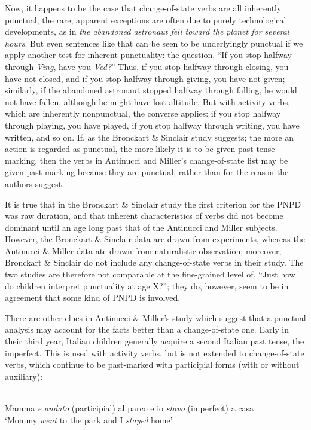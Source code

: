Now, it happens to be the case that change-of-state verbs are all inherently punctual; the rare, apparent exceptions are often due to purely technological developments, as in \textit{the abandoned astronaut fell toward the planet for several hours}. But even sentences like that can be seen to be underlyingly punctual if we apply another test for inherent punctuality: the question, ``If you stop halfway through \textit{Ving}, have you \textit{Ved?}'' Thus, if you stop halfway through closing, you have not closed, and if you stop halfway through giving, you have not given; similarly, if the abandoned astronaut stopped halfway through falling, he would not have fallen, although he might have lost altitude. But with activity verbs, which are inherently nonpunctual, the converse applies: if you stop halfway through playing, you have played, if you stop halfway through writing, you have written, and so on. If, as the Bronckart \& Sinclair study suggests; the more an action is regarded as punctual, the more likely it is to be given past-tense marking, then the verbs in Antinucci and Miller's change-of-state list may be given past marking because they are punctual, rather than for the reason the authors suggest.

It is true that in the Bronckart \& Sinclair study the first criterion for the PNPD was raw duration, and that inherent characteristics of verbs did not become dominant until an age long past that of the Antinucci and Miller subjects. However, the Bronckart \& Sinclair data are drawn from experiments, whereas the Antinucci \& Miller data ate drawn from naturalistic observation; moreover, Bronckart \& Sinclair do not include any change-of-state verbs in their study. The two studies are therefore not comparable at the fine-grained level of, ``Just how do children interpret punctuality at age X?''; they do, however, seem to be in agreement that some kind of PNPD is involved.

There are other clues in Antinucci \& Miller's study which
suggest that a punctual analysis may account for the facts better than a change-of-state one. Early in their third year, Italian children generally acquire a second Italian past tense, the imperfect. This is used with activity verbs, but is not extended to change-of-state verbs, which continue to be past-marked with participial forms (with or without auxiliary):


\ea\label{ex:3:22}
\\
  Mamma \textit{e} \textit{andato} (participial) al parco e io \textit{stavo} (imperfect) a casa\\
\glt `Mommy \textit{went} to the park and I \textit{stayed} home'
\z

